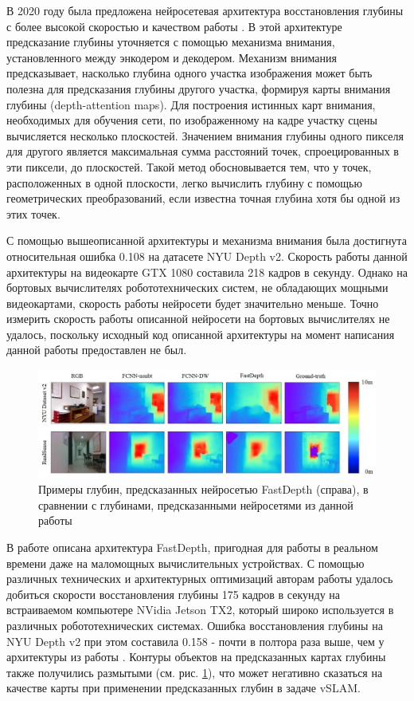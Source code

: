 \documentclass{mipt-thesis-ms}
\begin{document}
	В 2020 году была предложена нейросетевая архитектура восстановления глубины с более высокой скоростью и качеством работы \cite{huynh2020guiding}. В этой архитектуре предсказание глубины уточняется с помощью механизма внимания, установленного между энкодером и декодером. Механизм внимания предсказывает, насколько глубина одного участка изображения может быть полезна для предсказания глубины другого участка, формируя карты внимания глубины (depth-attention maps). Для построения истинных карт внимания, необходимых для обучения сети, по изображенному на кадре участку сцены вычисляется несколько плоскостей. Значением внимания глубины одного пикселя для другого является максимальная сумма расстояний точек, спроецированных в эти пиксели, до плоскостей. Такой метод обосновывается тем, что у точек, расположенных в одной плоскости, легко вычислить глубину с помощью геометрических преобразований, если известна точная глубина хотя бы одной из этих точек.
	
	С помощью вышеописанной архитектуры и механизма внимания была достигнута относительная ошибка 0.108 на датасете NYU Depth v2. Скорость работы данной архитектуры на видеокарте GTX 1080 составила 218 кадров в секунду. Однако на бортовых вычислителях робототехнических систем, не обладающих мощными видеокартами, скорость работы нейросети будет значительно меньше. Точно измерить скорость работы описанной нейросети на бортовых вычислителях не удалось, поскольку исходный код описанной архитектуры на момент написания данной работы предоставлен не был.
	
	\begin{figure}
		\includegraphics[width=1.0\textwidth]{img/depths.eps}
		\caption{Примеры глубин, предсказанных нейросетью FastDepth (справа), в сравнении с глубинами, предсказанными нейросетями из данной работы}
		\label{figure_fastdepth_preidctions}
	\end{figure}
	
	В работе \cite{wofk2019fastdepth} описана архитектура FastDepth, пригодная для работы в реальном времени даже на маломощных вычислительных устройствах. С помощью различных технических и архитектурных оптимизаций авторам работы удалось добиться скорости восстановления глубины 175 кадров в секунду на встраиваемом компьютере NVidia Jetson TX2, который широко используется в различных робототехнических системах. Ошибка восстановления глубины на NYU Depth v2 при этом составила 0.158 - почти в полтора раза выше, чем у архитектуры из работы \cite{huynh2020guiding}. Контуры объектов на предсказанных картах глубины также получились размытыми (см. рис. \ref{figure_fastdepth_preidctions}), что может негативно сказаться на качестве карты при применении предсказанных глубин в задаче vSLAM.
	
\end{document}
